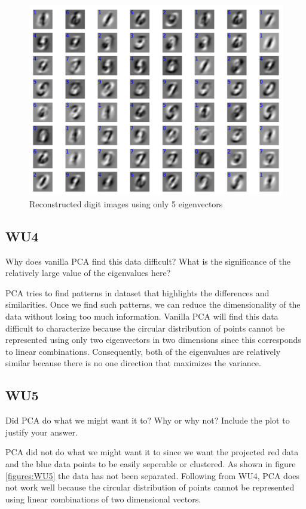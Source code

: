 \documentclass[a4paper,11pt]{article}
\begin{document}
\begin{figure}[!ht]
  \begin{center}
  \includegraphics[width=4.5in]{WU3_c.pdf}
  \caption{Reconstructed digit images using only 5 eigenvectors}
  \label{figures:WU3c}
  \end{center}
\end{figure}

\pagebreak
\subsection{WU4}
\textsf{Why does vanilla PCA find this data difficult? What is the
significance of the relatively large value of the eigenvalues
here?}\vspace{0.1in}

PCA tries to find patterns in dataset that highlights the differences
and similarities. Once we find such patterns, we can reduce the
dimensionality of the data without losing too much
information. Vanilla PCA will find this data difficult to characterize
because the circular distribution of points cannot be represented
using only two eigenvectors in two dimensions since this corresponds to 
linear combinations. Consequently, both of the eigenvalues are relatively similar because
there is no one direction that maximizes the variance.

\subsection{WU5}
\textsf{Did PCA do what we might want it to? Why or why not? Include
the plot to justify your answer.}\vspace{0.1in}

PCA did not do what we might want it to since we want the projected
red data and the blue data points to be easily seperable or clustered.
As shown in figure \ref{figures:WU5} the data has not been separated.
Following from WU4, PCA does not work well because the circular distribution 
of points cannot be represented using linear combinations of two dimensional vectors.
\end{document}
